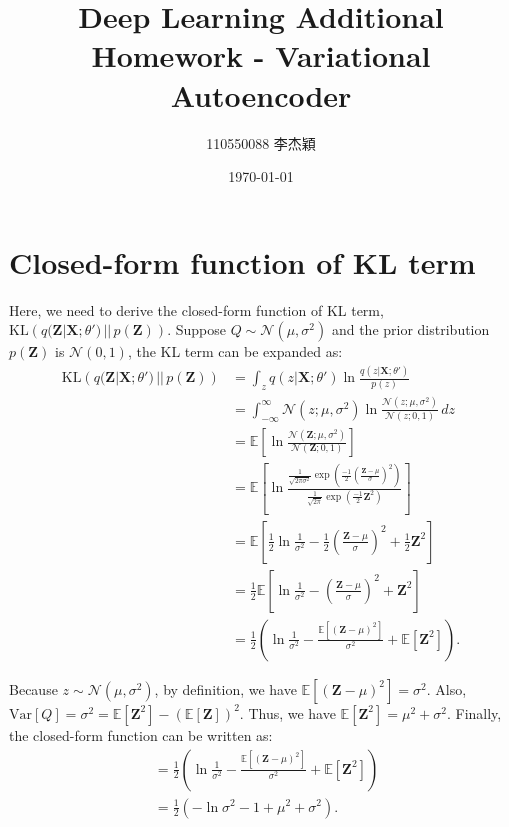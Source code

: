 \documentclass[a4paper]{article}
\title{Deep Learning Additional Homework - Variational Autoencoder}
\author{110550088 李杰穎}
\date{\today}
\begin{document}
\maketitle

\section{Closed-form function of KL term}

Here, we need to derive the closed-form function of KL term, $\text{KL}\left(q(\mathbf{Z}|\mathbf{X};\theta') \, || \, p(\mathbf{Z})\right)$. Suppose $Q \sim \mathcal{N}(\mu, \sigma^2)$ and the prior distribution $p(\mathbf{Z})$ is $\mathcal{N}(0, 1)$, the KL term can be expanded as:
\begin{align}
\text{KL}\left(q(\mathbf{Z}|\mathbf{X};\theta') \, || \, p(\mathbf{Z})\right) &= \int_z q(z|\mathbf{X};\theta') \ln \frac{q(z|\mathbf{X};\theta')}{p(z)} \\
&= \int_{-\infty}^{\infty} \mathcal{N}(z; \mu, \sigma^2) \ln \frac{\mathcal{N}(z; \mu, \sigma^2)}{\mathcal{N}(z; 0, 1)} \, dz \\
&= \mathbb{E}\left[\ln \frac{\mathcal{N}(\mathbf{Z}; \mu, \sigma^2)}{\mathcal{N}(\mathbf{Z}; 0, 1)} \right] \\
&= \mathbb{E}\left[\ln \frac{\frac{1}{\sqrt{2 \pi \sigma^2}} \exp(\frac{-1}{2} \left(\frac{\mathbf{Z}-\mu}{\sigma}\right)^2)}{\frac{1}{\sqrt{2 \pi}} \exp \left(\frac{-1}{2} \mathbf{Z}^2\right)} \right] \\
&= \mathbb{E}\left[\frac{1}{2} \ln \frac{1}{\sigma^2} - \frac{1}{2} \left(\frac{\mathbf{Z}-\mu}{\sigma}\right)^2 + \frac{1}{2} \mathbf{Z}^2 \right] \\
&= \frac{1}{2} \mathbb{E}\left[\ln \frac{1}{\sigma^2} - \left(\frac{\mathbf{Z}-\mu}{\sigma}\right)^2 + \mathbf{Z}^2 \right] \\
&= \frac{1}{2} \left( \ln \frac{1}{\sigma^2} - \frac{\mathbb{E}\left[(\mathbf{Z} - \mu)^2\right]}{\sigma^2} + \mathbb{E}\left[\mathbf{Z}^2 \right] \right).
\end{align}

Because $z \sim \mathcal{N}(\mu, \sigma^2)$, by definition, we have $\mathbb{E}\left[(\mathbf{Z} - \mu)^2\right] = \sigma^2$. Also, $\text{Var}\left[Q\right] = \sigma^2 = \mathbb{E}\left[\mathbf{Z}^2\right] - \left(\mathbb{E}\left[\mathbf{Z}\right]\right)^2$. Thus, we have $\mathbb{E}\left[\mathbf{Z}^2 \right] = \mu^2 + \sigma^2$. Finally, the closed-form function can be written as:
\begin{align}
&= \frac{1}{2} \left( \ln \frac{1}{\sigma^2} - \frac{\mathbb{E}\left[(\mathbf{Z} - \mu)^2\right]}{\sigma^2} + \mathbb{E}\left[\mathbf{Z}^2 \right] \right) \\
&= \frac{1}{2} \left( -\ln \sigma^2 - 1 + \mu^2 + \sigma^2 \right).
\end{align}
\end{document}
